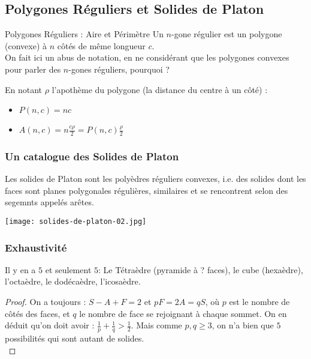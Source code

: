 \documentclass{beamercours}
\begin{document}
        \subsection{Polygones Réguliers et Solides de Platon}
            \begin{frame}{Polygones Réguliers : Aire et Périmètre}
                Un $n$-gone régulier est un polygone (convexe) à $n$ côtés de même longueur $c$.\\
                On fait ici un abus de notation, en ne considérant que les polygones convexes pour parler des $n$-gones réguliers, pourquoi ?
                \begin{theorem}
                    En notant $\rho$ l'apothème du polygone (la distance du centre à un côté) :
                    \begin{itemize}
                        \item $P(n, c) = nc$
                        \item $A(n, c) = n\frac{c\rho}{2} = P(n, c)\frac{\rho}{2}$
                    \end{itemize}
                \end{theorem}
            \end{frame}

            \begin{frame}
                \frametitle{Un catalogue des Solides de Platon}
                \begin{definition}
                    Les solides de Platon sont les polyèdres réguliers convexes, i.e. des solides dont les faces sont planes polygonales régulières, similaires et se rencontrent selon des segemnts appelés arêtes.
                \end{definition}
                \begin{center}
                    \texttt{[image: solides-de-platon-02.jpg]}    
                \end{center}
                
            \end{frame}

            \begin{frame}
                \frametitle{Exhaustivité}
                \begin{theorem}
                    Il y en a $5$ et seulement $5$: Le Tétraèdre (pyramide à ? faces), le cube (hexaèdre), l'octaèdre, le dodécaèdre, l'icosaèdre.
                \end{theorem}
                \begin{proof}
                    On a toujours : $S - A + F = 2$ et $pF = 2A = qS$, où $p$ est le nombre de côtés des faces, et $q$ le nombre de face se rejoignant à chaque sommet. 
                    On en déduit qu'on doit avoir : $\frac{1}{p} + \frac{1}{q} > \frac{1}{2}$. Mais comme $p, q \geq 3$, on n'a bien que $5$ possibilités qui sont autant de solides.\\
                \end{proof}                     
            \end{frame}
\end{document}
